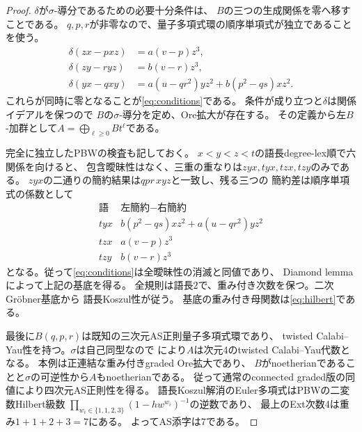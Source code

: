 \documentclass[11pt,a4paper]{ltjsarticle}
\theoremstyle{definition}
\begin{document}
\begin{proof}
$\delta$が$\sigma$-導分であるための必要十分条件は、
$B$の三つの生成関係を零へ移すことである。
$q,p,r$が非零なので、量子多項式環の順序単項式が独立であることを使う。
\begin{align*}
\delta(zx-pxz)&=a(v-p)z^3,\\
\delta(zy-ryz)&=b(v-r)z^3,\\
\delta(yx-qxy)&=a(u-qr^2)yz^2+b(p^2-qs)xz^2.
\end{align*}
これらが同時に零となることが\eqref{eq:conditions}である。
条件が成り立つと$\delta$は関係イデアルを保つので
$B$の$\sigma$-導分を定め、Ore拡大が存在する。
その定義から左$B$-加群として$A=\bigoplus_{\ell\geq0}Bt^\ell$である。

完全に独立したPBWの検査も記しておく。
$x<y<z<t$の語長degree-lex順で六関係を向けると、
包含曖昧性はなく、三重の重なりは$zyx,tyx,tzx,tzy$のみである。
$zyx$の二通りの簡約結果は$qpr\,xyz$と一致し、残る三つの
簡約差は順序単項式の係数として
\begin{equation}\label{eq:ambiguities}
\begin{array}{c|l}
\text{語} & \text{左簡約}-\text{右簡約}\\ \hline
 tyx & b(p^2-qs)xz^2+a(u-qr^2)yz^2\\
 tzx & a(v-p)z^3\\
 tzy & b(v-r)z^3
\end{array}
\end{equation}
となる。従って\eqref{eq:conditions}は全曖昧性の消滅と同値であり、
Diamond lemma\cite[Theorem~1.2]{Bergman}によって上記の基底を得る。
全規則は語長2で、重み付き次数を保つ。二次Gr\"obner基底から
語長Koszul性が従う\cite{Priddy}。
基底の重み付き母関数は\eqref{eq:hilbert}である。

最後に$B(q,p,r)$は既知の三次元AS正則量子多項式環であり、
twisted Calabi--Yau性を持つ。$\sigma$は自己同型なので
\cite[Theorem~3.3]{LWW}により$A$は次元4のtwisted Calabi--Yau代数となる。
本例は正連結な重み付きgraded Ore拡大であり、
$B$がnoetherianであることと$\sigma$の可逆性から$A$もnoetherianである。
従って通常のconnected graded版の同値により四次元AS正則性を得る。
語長Koszul解消のEuler多項式はPBWの二変数Hilbert級数
$\prod_{w_i\in\{1,1,2,3\}}(1-h w^{w_i})^{-1}$の逆数であり、
最上のExt次数4は重み$1+1+2+3=7$にある。
よってAS添字は7である。
\end{proof}
\end{document}
